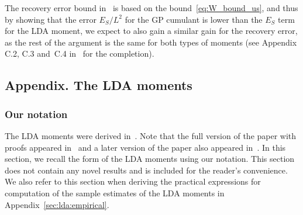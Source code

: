 \documentclass{article}
\begin{document}
The recovery error bound in~\cite{AnaEtAl2013} is based on the bound~\eqref{eq:W_bound_us}, and thus by showing that the error $E_S/L^2$ for the GP cumulant is lower than the $E_S$ term for the LDA moment, we expect to also gain a similar gain for the recovery error, as the rest of the argument is the same for both types of moments (see Appendix C.2, C.3 and~C.4 in~\cite{AnaEtAl2013} for the completion). 













































































\subsection{Appendix. The LDA moments}\label{sec:lda:moms}
\subsubsection{Our notation} \label{sec:lda:moms:notation}
The LDA moments were derived in~\cite{AnaEtAl2012}. Note that the full version of the paper with proofs appeared in~\cite{AnaEtAl2013} and a later version of the paper also appeared in~. In this section, we recall the form of the LDA moments using our notation. This section does not contain any novel results and is included for the reader's convenience. We also refer to this section when deriving the practical expressions for computation of the sample estimates of the LDA moments in Appendix~\ref{sec:lda:empirical}.
\end{document}
